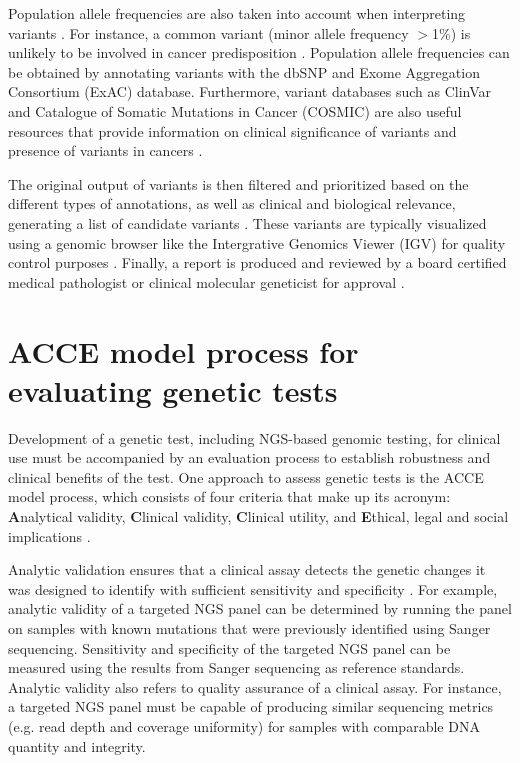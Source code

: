 Population allele frequencies are also taken into account when interpreting variants \cite{Oliver2015, Bao2014, Moorthie2013}. For instance, a common variant (minor allele frequency $>$1\%) is unlikely to be involved in cancer predisposition \cite{Baynes2007, Baker2006}. Population allele frequencies can be obtained by annotating variants with the dbSNP and Exome Aggregation Consortium (\acs{ExAC}) database. Furthermore, variant databases such as ClinVar and Catalogue of Somatic Mutations in Cancer (\acs{COSMIC}) are also useful resources that provide information on clinical significance of variants and presence of variants in cancers \cite{Oliver2015, Moorthie2013}.

The original output of variants is then filtered and prioritized based on the different types of annotations, as well as clinical and biological relevance, generating a list of candidate variants \cite{Moorthie2013, Oliver2015}. These variants are typically visualized using a genomic browser like the Intergrative Genomics Viewer (\acs{IGV}) for quality control purposes \cite{Oliver2015, Pabinger2014}. Finally, a report is produced and reviewed by a board certified medical pathologist or clinical molecular geneticist for approval \cite{Moorthie2013, Strom2016}.

\section{ACCE model process for evaluating genetic tests}
\label{sec:ACCEmodelprocessforevaluatinggenetictests}

Development of a genetic test, including NGS-based genomic testing, for clinical use must be accompanied by an evaluation process to establish robustness and clinical benefits of the test. One approach to assess genetic tests is the \acs{ACCE} model process, which consists of four criteria that make up its acronym: \textbf{A}nalytical validity, \textbf{C}linical validity, \textbf{C}linical utility, and \textbf{E}thical, legal and social implications \cite{Sanderson2005, Zimmern2007}.

Analytic validation ensures that a clinical assay detects the genetic changes it was designed to identify with sufficient sensitivity and specificity \cite{Sanderson2005, Zimmern2007}. For example, analytic validity of a targeted NGS panel can be determined by running the panel on samples with known mutations that were previously identified using Sanger sequencing. Sensitivity and specificity of the targeted NGS panel can be measured using the results from Sanger sequencing as reference standards. Analytic validity also refers to quality assurance of a clinical assay. For instance, a targeted NGS panel must be capable of producing similar sequencing metrics (e.g. read depth and coverage uniformity) for samples with comparable DNA quantity and integrity.

